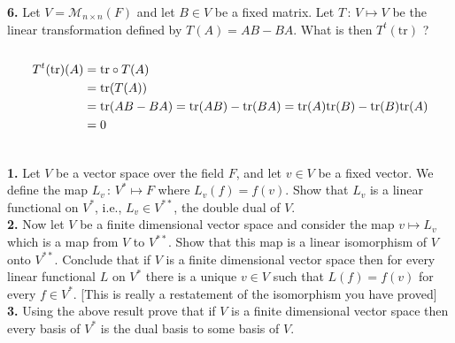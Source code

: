 \documentclass[11pt]{amsart}
\theoremstyle{definition}  %
\begin{document}
\newpage
\vskip 0.1cm
\noindent
{\bf 6.} Let $V = \mathcal{M}_{n\times n}(F)$ and let $B \in V$ be a fixed matrix. Let $T \, : \, V \mapsto V$ be the linear transformation defined by $T(A) = AB - BA$. 
What is then $T^t(\mathrm{tr})$ ?  \\
\\
\begin{align*}
	T^t(\mathrm{tr})(A) &= \mathrm{tr} \circ T(A) \\
		&= \mathrm{tr}(T(A)) \\
		&= \mathrm{tr}(AB-BA) = \mathrm{tr}(AB)-\mathrm{tr}(BA)=\mathrm{tr}(A)\mathrm{tr}(B)-\mathrm{tr}(B)\mathrm{tr}(A)\\
		&= 0
\end{align*}







\vfill
\eject
{}\\
{\bf 1.} Let $V$ be a vector space over the field $F$, and let $v \in V$ be a fixed vector. We define the map $L_v \, : \, V^* \mapsto F$ where
$L_v(f) = f(v)$. Show that $L_v$ is a linear functional on $V^*$, i.e., $L_v \in V^{**}$, the double dual of $V$. \\

\vskip 0.1cm
\noindent 
{\bf 2.} Now let $V$ be a finite dimensional vector space and  consider the map $v \mapsto L_v$ which is a map from $V$ to $V^{**}$. Show that this map is a linear isomorphism of $V$ onto $V^{**}$.
Conclude that if $V$ is a finite dimensional vector space then for every linear functional $L$ on $V^{*}$ there is a unique $v \in V$ such that $L(f) = f(v)$ for every $f \in V^{*}$. [This is really 
a restatement of the isomorphism you have proved]\\

\vskip 0.1cm
\noindent 
{\bf 3.}  Using the above result prove that if $V$ is a finite dimensional vector space then every basis of $V^{*}$ is the dual basis to some basis of $V$. \\
\end{document}
